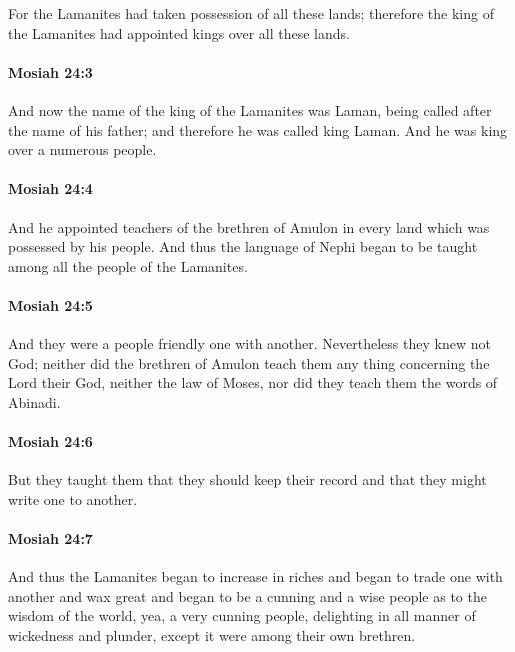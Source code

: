 			For the Lamanites had taken possession of all these lands;
			therefore the king of the Lamanites had appointed kings over all these lands.

		\paragraph{Mosiah 24:3} %
			\label{MOSIAH-24-3}

			And now the name of the king of the Lamanites was Laman,
			being called after the name of his father;
			and therefore he was called king Laman.
			And he was king over a numerous people.

		\paragraph{Mosiah 24:4} %
			\label{MOSIAH-24-4}

			And he appointed teachers of the brethren of Amulon
			in every land which was possessed by his people.
			And thus the language of Nephi began to be taught
			among all the people of the Lamanites.

		\paragraph{Mosiah 24:5} %
			\label{MOSIAH-24-5}

			And they were a people friendly one with another.
			Nevertheless they knew not God;
			neither did the brethren of Amulon teach them any thing
			concerning the Lord their God,
			neither the law of Moses,
			nor did they teach them the words of Abinadi.

		\paragraph{Mosiah 24:6} %
			\label{MOSIAH-24-6}

			But they taught them that they should keep their record
			and that they might write one to another.

		\paragraph{Mosiah 24:7} %
			\label{MOSIAH-24-7}

			And thus the Lamanites began to increase in riches
			and began to trade one with another and wax great
			and began to be a cunning and a wise people as to the wisdom of the world,
			yea, a very cunning people,
			delighting in all manner of wickedness and plunder,
			except it were among their own brethren.

